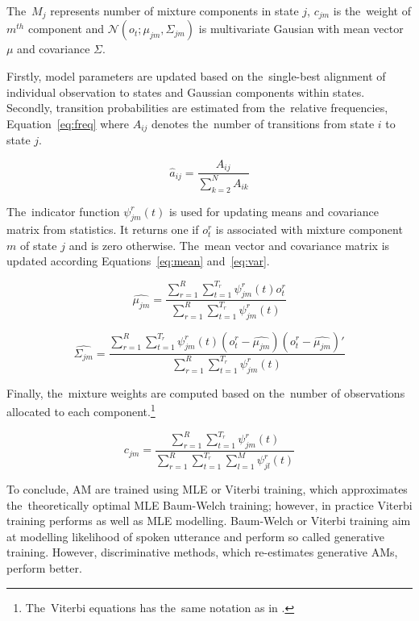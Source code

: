 The~$M_j$ represents number of mixture components in state $j$, $c_{jm}$ is the~weight of $m^{th}$ component and $\mathcal{N}(o_t; \mu_{jm}, \Sigma_{jm})$
is multivariate Gausian with mean vector $\mu$ and covariance $\Sigma$.

Firstly, model parameters are updated based on the~single-best alignment of individual observation to states and Gaussian components within states.
Secondly, transition probabilities are estimated from the~relative frequencies, Equation~\ref{eq:freq} where $A_{ij}$ denotes the~number of transitions from state $i$ to state $j$.

\begin{equation}\label{eq:freq}
    \hat{a}_{ij} = \frac{A_{ij}}{\sum_{k=2}^{N}{A_{ik}}}
\end{equation}

The~indicator function $\psi^r_{jm}(t)$ is used for updating means and covariance matrix from statistics.
It returns one if $o^r_t$ is associated with mixture component $m$ of state $j$ and is zero otherwise.
The~mean vector and covariance matrix is updated according Equations~\ref{eq:mean} and~\ref{eq:var}.

\begin{equation}\label{eq:mean}
    \hat{\mu_{jm}} = \frac{\sum_{r=1}^{R}{\sum_{t=1}^{T_r}{\psi^r_{jm}(t)o^r_t}}}  {\sum_{r=1}^{R}{\sum_{t=1}^{T_r}{\psi^r_{jm}(t)}}}
\end{equation}

\begin{equation}\label{eq:var}
    \hat{\Sigma_{jm}} = \frac{\sum_{r=1}^{R}{\sum_{t=1}^{T_r}{\psi^r_{jm}(t)(o^r_t - \hat{\mu_{jm}})(o^r_t - \hat{\mu_{jm}})'}}}  {\sum_{r=1}^{R}{\sum_{t=1}^{T_r}{\psi^r_{jm}(t)}}}
\end{equation}

Finally, the~mixture weights are computed based on the~number of observations allocated to each component.\footnote{The~Viterbi equations has the~same notation as in \cite{buthpitiya2012parallel}.}

\begin{equation}\label{eq:weights}
    c_{jm} = \frac{\sum_{r=1}^{R}{\sum_{t=1}^{T_r}{\psi^r_{jm}(t)}}} {\sum_{r=1}^{R}{\sum_{t=1}^{T_r}\sum_{l=1}^{M}{\psi^r_{jl}(t)}}}
\end{equation}


To conclude, \ac{AM} are trained using \ac{MLE} or Viterbi training, which approximates the~theoretically optimal \ac{MLE} Baum-Welch training; however, in practice Viterbi training performs as well as \ac{MLE} modelling.
Baum-Welch or Viterbi training aim at modelling likelihood of spoken utterance and perform so called generative training.
However, discriminative methods, which re-estimates generative \acp{AM}, perform better.

